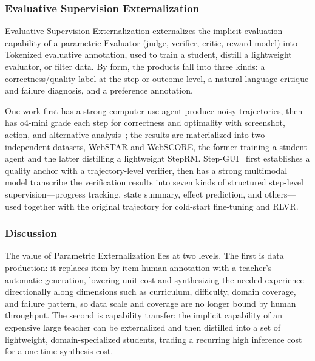\subsubsection{Evaluative Supervision Externalization}
\label{sec:eval-sup-ext}

Evaluative Supervision Externalization externalizes the implicit evaluation capability of a parametric Evaluator (judge, verifier, critic, reward model) into Tokenized evaluative annotation, used to train a student, distill a lightweight evaluator, or filter data. By form, the products fall into three kinds: a correctness/quality label at the step or outcome level, a natural-language critique and failure diagnosis, and a preference annotation.

One work first has a strong computer-use agent produce noisy trajectories, then has o4-mini grade each step for correctness and optimality with screenshot, action, and alternative analysis~\cite{He25g}; the results are materialized into two independent datasets, WebSTAR and WebSCORE, the former training a student agent and the latter distilling a lightweight StepRM. Step-GUI~\cite{Yan25x} first establishes a quality anchor with a trajectory-level verifier, then has a strong multimodal model transcribe the verification results into seven kinds of structured step-level supervision---progress tracking, state summary, effect prediction, and others---used together with the original trajectory for cold-start fine-tuning and RLVR.

\subsubsection{Discussion}

The value of Parametric Externalization lies at two levels. The first is data production: it replaces item-by-item human annotation with a teacher's automatic generation, lowering unit cost and synthesizing the needed experience directionally along dimensions such as curriculum, difficulty, domain coverage, and failure pattern, so data scale and coverage are no longer bound by human throughput. The second is capability transfer: the implicit capability of an expensive large teacher can be externalized and then distilled into a set of lightweight, domain-specialized students, trading a recurring high inference cost for a one-time synthesis cost.


